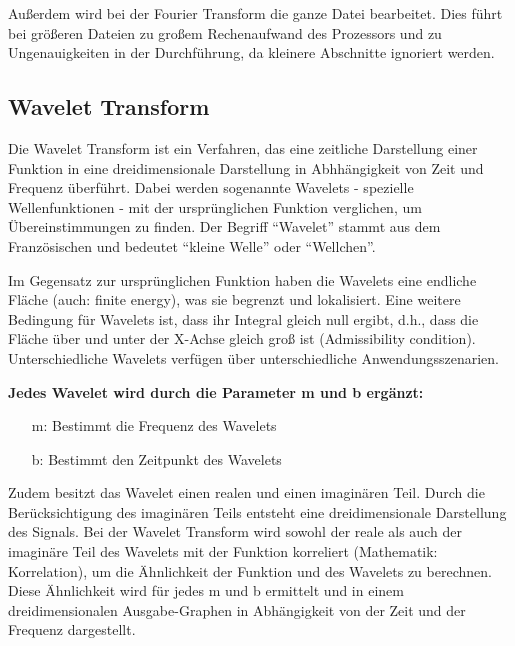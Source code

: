 \par

Außerdem wird bei der Fourier Transform die ganze Datei bearbeitet. Dies führt bei größeren Dateien zu großem Rechenaufwand des Prozessors und zu Ungenauigkeiten in der Durchführung, da kleinere Abschnitte ignoriert werden.

%
\subsection{Wavelet Transform}
\label{wavelet-transformation}
%

Die Wavelet Transform ist ein Verfahren, das eine zeitliche Darstellung einer Funktion in eine dreidimensionale Darstellung in Abhhängigkeit von Zeit und Frequenz überführt. Dabei werden sogenannte Wavelets - spezielle Wellenfunktionen - mit der ursprünglichen Funktion verglichen, um Übereinstimmungen zu finden. Der Begriff \enquote{Wavelet} stammt aus dem Französischen und bedeutet \enquote{kleine Welle} oder \enquote{Wellchen}.

\par

Im Gegensatz zur ursprünglichen Funktion haben die Wavelets eine endliche Fläche (auch: finite energy), was sie begrenzt und lokalisiert. Eine weitere Bedingung für Wavelets ist, dass ihr Integral gleich null ergibt, d.h., dass die Fläche über und unter der X-Achse gleich groß ist (Admissibility condition). Unterschiedliche Wavelets verfügen über unterschiedliche Anwendungsszenarien.

\par

\textbf{Jedes Wavelet wird durch die Parameter m und b ergänzt:}

%
\begin{itemize}
    \item[m:] Bestimmt die Frequenz des Wavelets
    \item[b:] Bestimmt den Zeitpunkt des Wavelets
\end{itemize}
%

Zudem besitzt das Wavelet einen realen und einen imaginären Teil. Durch die Berücksichtigung des imaginären Teils entsteht eine dreidimensionale Darstellung des Signals. Bei der Wavelet Transform wird sowohl der reale als auch der imaginäre Teil des Wavelets mit der Funktion korreliert (Mathematik: Korrelation), um die Ähnlichkeit der Funktion und des Wavelets zu berechnen. Diese Ähnlichkeit wird für jedes m und b ermittelt und in einem dreidimensionalen Ausgabe-Graphen in Abhängigkeit von der Zeit und der Frequenz dargestellt.


